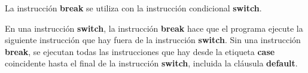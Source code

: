 La instrucción \textbf{break} se utiliza con la instrucción condicional \textbf{switch}.

En una instrucción \textbf{switch}, la instrucción \textbf{break} hace que el programa ejecute la siguiente instrucción que hay fuera de la instrucción \textbf{switch}. Sin una instrucción \textbf{break}, se ejecutan todas las instrucciones que hay desde la etiqueta \textbf{case} coincidente hasta el final de la instrucción \textbf{switch}, incluida la cláusula \textbf{default}.
